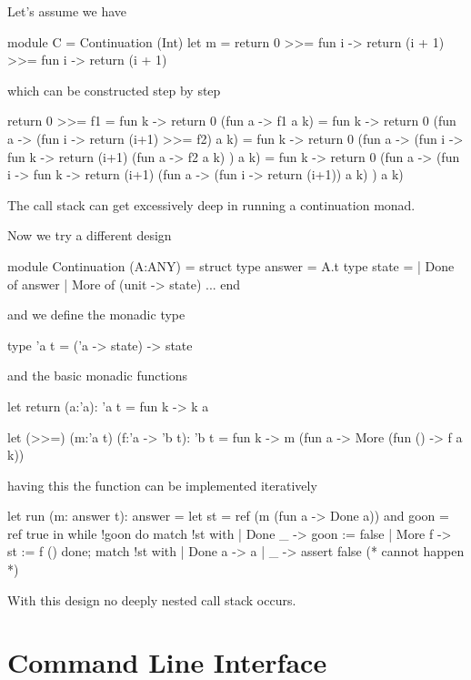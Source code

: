 Let's assume we have
\begin{ocaml}
   module C = Continuation (Int)
   let m = return 0 >>= fun i -> return (i + 1) >>= fun i -> return (i + 1)
\end{ocaml}
%
which can be constructed step by step
\begin{ocaml}
  return 0 >>= f1
  =
  fun k -> return 0 (fun a -> f1 a k)
  =
  fun k -> return 0 (fun a -> (fun i -> return (i+1) >>= f2) a k)
  =
  fun k -> return
             0
             (fun a -> (fun i ->
                          fun k ->
                            return
                              (i+1)
                              (fun a -> f2 a k)
                       ) a k)
  =
  fun k -> return
             0
             (fun a -> (fun i ->
                          fun k ->
                            return
                              (i+1)
                              (fun a -> (fun i -> return (i+1)) a k)
                       ) a k)
\end{ocaml}
%
The call stack can get excessively deep in running a continuation monad.

Now we try a different design
%
\begin{ocaml}
  module Continuation (A:ANY) =
  struct
    type answer = A.t
    type state =
      | Done of answer
      | More of (unit -> state)
    ...
  end
\end{ocaml}
%
and we define the monadic type
\begin{ocaml}
  type 'a t = ('a -> state) -> state
\end{ocaml}
%
and the basic monadic functions
\begin{ocaml}
  let return (a:'a): 'a t =
    fun k -> k a

  let (>>=) (m:'a t) (f:'a -> 'b t): 'b t =
    fun k -> m (fun a -> More (fun () -> f a k))
\end{ocaml}
%
having this the function  can be implemented iteratively
\begin{ocaml}
  let run (m: answer t): answer =
    let st = ref (m (fun a -> Done a))
    and goon = ref true
    in
    while !goon do
      match !st with
      | Done _ ->
         goon := false
      | More f ->
         st := f ()
    done;
    match !st with
    | Done a ->
       a
    | _ ->
       assert false (* cannot happen *)
\end{ocaml}
%
With this design no deeply nested call stack occurs.




\section{Command Line Interface}

